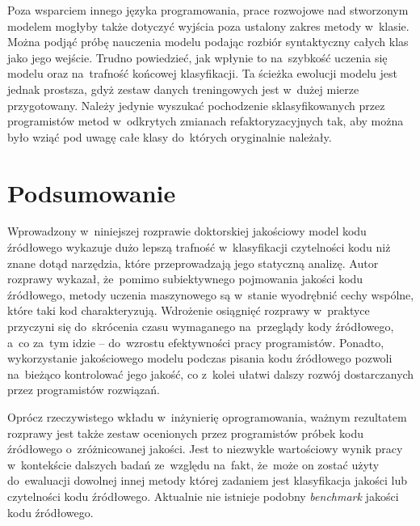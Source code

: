 \documentclass[twoside]{praca}
\renewcommand\lstlistlistingname{Spis listingów}
\begin{document}
Poza wsparciem innego języka programowania, prace rozwojowe nad stworzonym modelem mogłyby także dotyczyć wyjścia poza ustalony zakres metody w~klasie. Można podjąć próbę nauczenia modelu podając rozbiór syntaktyczny całych klas jako jego wejście. Trudno powiedzieć, jak wpłynie to na~szybkość uczenia się modelu oraz na~trafność końcowej klasyfikacji. Ta ścieżka ewolucji modelu jest jednak prostsza, gdyż zestaw danych treningowych jest w~dużej mierze przygotowany. Należy jedynie wyszukać pochodzenie sklasyfikowanych przez programistów metod w~odkrytych zmianach refaktoryzacyjnych tak, aby można było wziąć pod uwagę całe klasy do~których oryginalnie należały.

\section{Podsumowanie}

Wprowadzony w~niniejszej rozprawie doktorskiej jakościowy model kodu źródłowego wykazuje dużo lepszą trafność w~klasyfikacji czytelności kodu niż znane dotąd narzędzia, które przeprowadzają jego statyczną analizę. Autor rozprawy wykazał, że~pomimo subiektywnego pojmowania jakości kodu źródłowego, metody uczenia maszynowego są w~stanie wyodrębnić cechy wspólne, które taki kod charakteryzują. Wdrożenie osiągnięć rozprawy w~praktyce przyczyni się do~skrócenia czasu wymaganego na~przeglądy kody źródłowego, a~co za~tym idzie -- do~wzrostu efektywności pracy programistów. Ponadto, wykorzystanie jakościowego modelu podczas pisania kodu źródłowego pozwoli na~bieżąco kontrolować jego jakość, co z~kolei ułatwi dalszy rozwój dostarczanych przez programistów rozwiązań.

Oprócz rzeczywistego wkładu w~inżynierię oprogramowania, ważnym rezultatem rozprawy jest także zestaw ocenionych przez programistów próbek kodu źródłowego o~zróżnicowanej jakości. Jest to niezwykle wartościowy wynik pracy w~kontekście dalszych badań ze~względu na~fakt, że~może on zostać użyty do~ewaluacji dowolnej innej metody której zadaniem jest klasyfikacja jakości lub czytelności kodu źródłowego. Aktualnie nie istnieje podobny \textit{benchmark} jakości kodu źródłowego.


\clearpage
\markboth{\headingfont{}}{}
\listoffigures

\clearpage
{}
\listoftables

\clearpage
\addcontentsline{toc}{chapter}{\lstlistlistingname}
\lstlistoflistings
\end{document}
